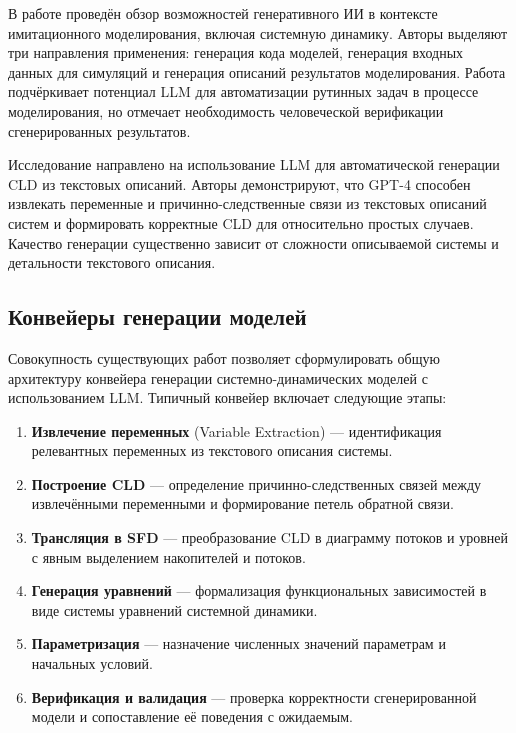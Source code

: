 В работе \cite{akhavan2024generative} проведён обзор возможностей генеративного ИИ в контексте имитационного моделирования, включая системную динамику. Авторы выделяют три направления применения: генерация кода моделей, генерация входных данных для симуляций и генерация описаний результатов моделирования. Работа подчёркивает потенциал LLM для автоматизации рутинных задач в процессе моделирования, но отмечает необходимость человеческой верификации сгенерированных результатов.

Исследование \cite{liu2025leveraging} направлено на использование LLM для автоматической генерации CLD из текстовых описаний. Авторы демонстрируют, что GPT-4 способен извлекать переменные и причинно-следственные связи из текстовых описаний систем и формировать корректные CLD для относительно простых случаев. Качество генерации существенно зависит от сложности описываемой системы и детальности текстового описания.

\subsection{Конвейеры генерации моделей}

Совокупность существующих работ позволяет сформулировать общую архитектуру конвейера генерации системно-динамических моделей с использованием LLM. Типичный конвейер включает следующие этапы:

\begin{enumerate}
    \item \textbf{Извлечение переменных} (Variable Extraction) --- идентификация релевантных переменных из текстового описания системы.
    \item \textbf{Построение CLD} --- определение причинно-следственных связей между извлечёнными переменными и формирование петель обратной связи.
    \item \textbf{Трансляция в SFD} --- преобразование CLD в диаграмму потоков и уровней с явным выделением накопителей и потоков.
    \item \textbf{Генерация уравнений} --- формализация функциональных зависимостей в виде системы уравнений системной динамики.
    \item \textbf{Параметризация} --- назначение численных значений параметрам и начальных условий.
    \item \textbf{Верификация и валидация} --- проверка корректности сгенерированной модели и сопоставление её поведения с ожидаемым.
\end{enumerate}

